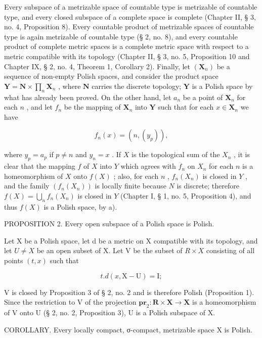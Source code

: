 Every subspace of a metrizable space of countable type is metrizable of countable type, and every closed subspace of a complete space is complete (Chapter II, § 3, no. 4, Proposition 8). Every countable product of metrizable spaces of countable type is again metrizable of countable type (§ 2, no. 8), and every countable product of complete metric spaces is a complete metric space with respect to a metric compatible with its topology (Chapter II, § 3, no. 5, Proposition 10 and Chapter IX, § 2, no. 4, Theorem 1, Corollary 2). Finally, let \((\mathbf{X}_n)\) be a sequence of non-empty Polish spaces, and consider the product space \(\mathbf{Y} = \mathbf{N} \times \prod_{n} \mathbf{X}_n\) , where \(\mathbf{N}\) carries the discrete topology; \(\mathbf{Y}\) is a Polish space by what has already been proved. On the other hand, let \(a_n\) be a point of \(\mathbf{X}_n\) for each \(n\) , and let \(f_n\) be the mapping of \(\mathbf{X}_n\) into \(\mathbf{Y}\) such that for each \(x \in \mathbf{X}_n\) we have

\[
f _ {n} (x) = (n, \left(y _ {p}\right)),
\]

where \(y_{p} = a_{p}\) if \(p \neq n\) and \(y_{n} = x\) . If \(X\) is the topological sum of the \(X_{n}\) , it is clear that the mapping \(f\) of \(X\) into \(Y\) which agrees with \(f_{n}\) on \(X_{n}\) for each \(n\) is a homeomorphism of \(X\) onto \(f(X)\) ; also, for each \(n\) , \(f_{n}(X_{n})\) is closed in \(Y\) , and the family \((f_{n}(X_{n}))\) is locally finite because \(N\) is discrete; therefore \(f(X) = \bigcup_{n} f_{n}(X_{n})\) is closed in \(Y\) (Chapter I, § 1, no. 5, Proposition 4), and thus \(f(X)\) is a Polish space, by a).

PROPOSITION 2. Every open subspace of a Polish space is Polish.

Let X be a Polish space, let d be a metric on X compatible with its topology, and let \(U \neq X\) be an open subset of X. Let V be the subset of \(R \times X\) consisting of all points \((t, x)\) such that

\[
t. d (x, \mathrm{X} - \mathrm{U}) = \mathrm{I};
\]

V is closed by Proposition 3 of § 2, no. 2 and is therefore Polish (Proposition 1). Since the restriction to V of the projection \(\mathbf{pr}_{2}:\mathbf{R}\times\mathbf{X}\to\mathbf{X}\) is a homeomorphism of V onto U (§ 2, no. 2, Proposition 3), U is a Polish subspace of X.

COROLLARY. Every locally compact, σ-compact, metrizable space X is Polish.

